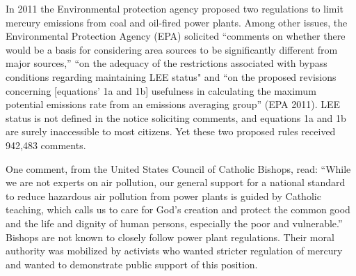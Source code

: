 
In 2011 the Environmental protection agency proposed two regulations to limit mercury emissions from coal and oil-fired power plants. Among other issues, the Environmental Protection Agency (EPA) solicited ``comments on whether there would be a basis for considering area sources to be significantly different from major sources,'' ``on the adequacy of the restrictions associated with bypass conditions regarding maintaining LEE status" and ``on the proposed revisions concerning [equations' 1a and 1b] usefulness in calculating the maximum potential emissions rate from an emissions averaging group'' (EPA 2011). LEE status is not defined in the notice soliciting comments, and equations 1a and 1b are surely inaccessible to most citizens. Yet these two proposed rules received 942,483 comments. 

One comment, from the United States Council of Catholic Bishops, read: ``While we are not experts on air pollution, our general support for a national standard to reduce hazardous air pollution from power plants is guided by Catholic teaching, which calls us to care for God’s creation and protect the common good and the life and dignity of human persons, especially the poor and vulnerable.'' Bishops are not known to closely follow power plant regulations. Their moral authority was mobilized by activists who wanted stricter regulation of mercury and wanted to demonstrate public support of this position. %

